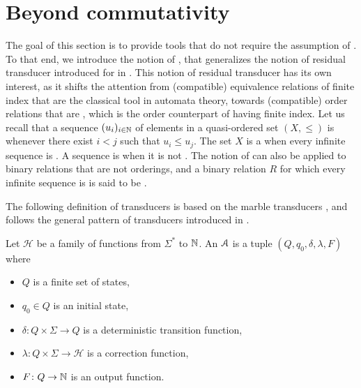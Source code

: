 \section{Beyond commutativity}
\label{beyond-commutative:sec}

\AP The goal of this section is to provide tools that do not require the
assumption of . To that end, we introduce the notion of
, that generalizes the notion of residual
transducer introduced for  in \cite{LOPEZ23b}.
This notion of residual transducer has its own interest, as it shifts the
attention from (compatible) equivalence relations of finite index that are the
classical tool in automata theory, towards (compatible) order relations that
are , which is the order counterpart of having finite
index. Let us recall that a sequence $(u_i)_{i \in \mathbb{N}}$ of elements in a
quasi-ordered set $(X, \leq)$ is  whenever there exist $i < j$ such
that $u_i \leq u_j$. The set $X$ is a  when every
infinite sequence is . A sequence is  when it is not
. The notion of  can also be applied to
binary relations that are not orderings, and a binary relation $R$ for which
every infinite sequence is  is said to be 
\cite{MELL98}.

The following definition of transducers is based on
the marble transducers \cite{EHB99}, and follows the general pattern of
transducers introduced in \cite{LOPEZ23b}.

\begin{definition}
    Let $\mathcal{H}$ be a family of functions
    from $\Sigma^*$ to $\mathbb{N}$.
    An  $\mathcal{A}$ is
    a tuple $(Q, q_0, \delta, \lambda, F)$ where
    \begin{itemize}
        \item $Q$ is a finite set of states,
        \item $q_0 \in Q$ is an initial state,
        \item $\delta \colon Q \times \Sigma \to Q$
            is a deterministic transition function,
        \item $\lambda \colon Q \times \Sigma \to \mathcal{H}$
            is a correction function,
        \item $F \colon Q \to \mathbb{N}$ is an output function.
    \end{itemize}
\end{definition}

